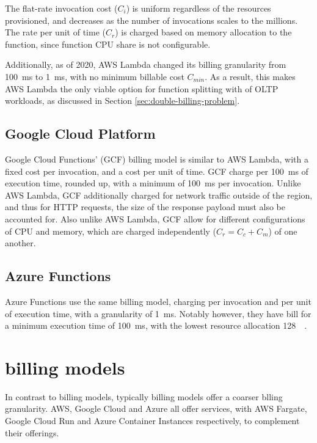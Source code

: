 The flat-rate invocation cost ($C_i$) is uniform regardless of the resources provisioned, and decreases as the number of invocations scales to the millions. The rate per unit of time ($C_r$) is charged based on memory allocation to the function, since function CPU share is not configurable.

Additionally, as of 2020, AWS Lambda changed its billing granularity from \SI{100}{\milli\second} to \SI{1}{\milli\second}\cite{AWSLambdaChanges}, with no minimum billable cost $C_{min}$. As a result, this makes AWS Lambda the only viable option for function splitting with of OLTP workloads, as discussed in Section \ref{sec:double-billing-problem}.


\subsection{Google Cloud Platform}
Google Cloud Functions' (GCF) billing model is similar to AWS Lambda, with a fixed cost per invocation, and a cost per unit of time. GCF charge per \SI{100}{\milli\second} of execution time, rounded up, with a minimum of \SI{100}{\milli\second} per invocation\cite{PricingCloudFunctions}. Unlike AWS Lambda, GCF additionally charged for network traffic outside of the region, and thus for HTTP requests, the size of the response payload must also be accounted for. Also unlike AWS Lambda, GCF allow for different configurations of CPU and memory, which are charged independently ($C_r = C_c + C_m$) of one another.

\subsection{Azure Functions}
Azure Functions use the same billing model, charging per invocation and per unit of execution time, with a granularity of \SI{1}{\milli\second}\cite{PricingFunctionsMicrosoft}. Notably however, they have bill for a minimum execution time of \SI{100}{\milli\second}, with the lowest resource allocation \SI{128}{\mega\byte}.

\section{\caas{} billing models}
In contrast to \faas{} billing models, typically \caasxlong{} billing models offer a coarser blling granularity. AWS, Google Cloud and Azure all offer \caas{} services, with AWS Fargate, Google Cloud Run and Azure Container Instances respectively, to complement their \faas{} offerings.

